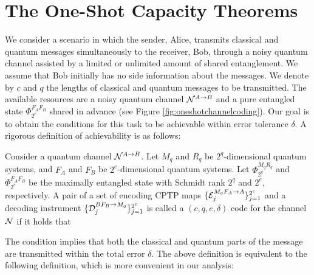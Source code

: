 \documentclass[journal]{IEEEtran}
\begin{document}
\section{The One-Shot Capacity Theorems}





We consider a scenario in which the sender, Alice, transmits classical and quantum messages simultaneously to the receiver, Bob, through a noisy quantum channel assisted by a limited or unlimited amount of shared entanglement. 
We assume that Bob initially has no side information about the messages. 
We denote by $c$ and $q$ the lengths of classical and quantum messages to be transmitted.
The available resources are a noisy quantum channel ${\mathcal N}^{A \rightarrow B}$ and a pure entangled state $\Phi_{2^e}^{F_AF_B}$ shared in advance (see Figure \ref{fig:oneshotchannelcoding}).
Our goal is to obtain the conditions for this task to be achievable within error tolerance $\delta$.
A rigorous definition of achievability is as follows:




Consider  a quantum channel ${\mathcal N}^{A\rightarrow B}$. Let $M_q$ and $R_q$ be $2^q$-dimensional quantum systems, and $F_A$ and $F_B$ be $2^e$-dimensional quantum systems.
Let $\Phi_{2^q}^{M_qR_q}$ and $\Phi_{2^e}^{F_AF_B}$ be the maximally entangled state with Schmidt rank $2^q$ and $2^e$, respectively.
A pair of a set of encoding CPTP maps $\{{\mathcal E}_j^{M_qF_A\rightarrow A}\}_{j=1}^{2^c}$ and a decoding instrument $\{{\mathcal D}_j^{BF_B\rightarrow M_q}\}_{j=1}^{2^c}$ is called a $(c,q,e,\delta)$ code for the channel ${\mathcal N}$ if it holds that
\edfn

\noindent
The condition  implies that both the classical and quantum parts of the message are transmitted within the total error $\delta$.
The above definition is equivalent to the following definition, which is more convenient in our analysis:
\end{document}
